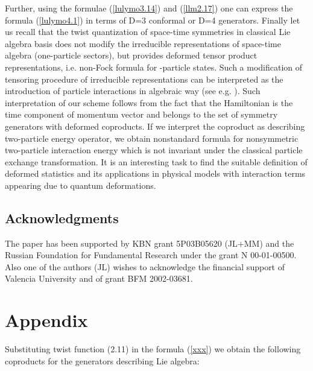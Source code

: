 \documentclass[a4paper,12pt,showkeys]{article}
\begin{document}
Further, using the formulae (\ref{lulymo3.14}) and
    (\ref{llm2.17}) one can express the formula
(\ref{lulymo4.1}) in terms of D=3 conformal or D=4 \coordHE{} generators.
Finally let us recall that
   the twist quantization of space-time symmetries in classical Lie algebra basis
   does not modify the irreducible representations of space-time algebra
   (one-particle sectors),
 but  provides deformed tensor   product representations, i.e. non-Fock
formula for \coordHE{}-particle states. Such a modification of tensoring
procedure of irreducible representations  can
    be interpreted as the introduction of particle interactions
    in algebraic way (see e.g.
     \cite{ll17,ll18}).
     Such interpretation of our  scheme follows  from
the fact that the Hamiltonian \coordHE{} is the time component of momentum vector
 and belongs to the set of symmetry generators with deformed coproducts. If we
interpret  the coproduct \coordHE{} as describing two-particle energy
operator, we obtain nonstandard formula for nonsymmetric two-particle
interaction energy which is not invariant under the
 classical   particle exchange transformation.
It is
 an interesting task
  to find the suitable definition of deformed statistics
 and its applications in physical models
  with \sloppy
   interaction terms appearing due to quantum deformations.

\subsection*{Acknowledgments}
The paper has been supported by KBN grant 5P03B05620 (JL+MM) and
the Russian Foundation for Fundamental Research under the grant N
00-01-00500. Also one of the authors (JL) wishes to acknowledge
the financial support
 of Valencia University and of grant BFM 2002-03681.



\section*{Appendix}

Substituting twist function (2.11) in the formula
(\ref{xxx}) we obtain the following coproducts for the generators
\coordHE{}  \coordHE{} describing
\coordHE{} Lie algebra:
\end{document}
